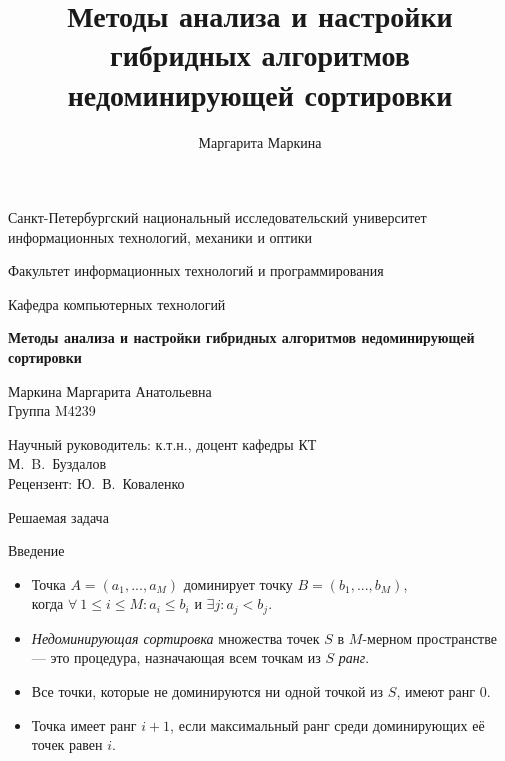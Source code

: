 \documentclass[table]{beamer}
\title[Недоминирующая сортировка]{Методы анализа и настройки гибридных алгоритмов недоминирующей сортировки}
\author[Маргарита Маркина]{Маргарита Маркина}
\institute[]{Национальный исследовательский университет информационных технологий, механики и оптики}
\date{}
\begin{document}
\begin{frame}
\begin{center}
{\scriptsize Санкт-Петербургский национальный исследовательский университет \\ информационных технологий, механики и оптики}

\vspace{1cm}

{\scriptsize Факультет информационных технологий и программирования

Кафедра компьютерных технологий}

\vspace{1cm}

\vbox{\large\bfseries
Методы анализа и настройки гибридных алгоритмов недоминирующей сортировки}

\vspace{1cm}

{\large Маркина Маргарита Анатольевна \\}
{\large Группа M4239}

\vspace{1cm}

{\large Научный руководитель: к.т.н., доцент кафедры КТ \\}
{\large М.~B.~Буздалов \\}
{\large Рецензент: Ю.~В.~Коваленко \\}

\end{center}
\end{frame}


\begin{frame}{Решаемая задача}
\begin{block}{Введение}
\begin{itemize}
\item Точка $A=(a_1,...,a_M)$ доминирует точку $B=(b_1,...,b_M)$, \\
когда $\forall ~ 1 \leq i \leq M : a_i \leq b_i$ и $\exists j : a_j < b_j $.
\item \textit{Недоминирующая сортировка} множества точек $S$ в $M$-мерном пространстве — это процедура, назначающая всем точкам из $S$ \textit{ранг}.
\item Все точки, которые не доминируются ни одной точкой из $S$, имеют ранг 0.
\item Точка имеет ранг $i+1$, если максимальный ранг среди доминирующих  её точек равен $i$.
\end{itemize}
\end{block}
\end{frame}
\end{document}

